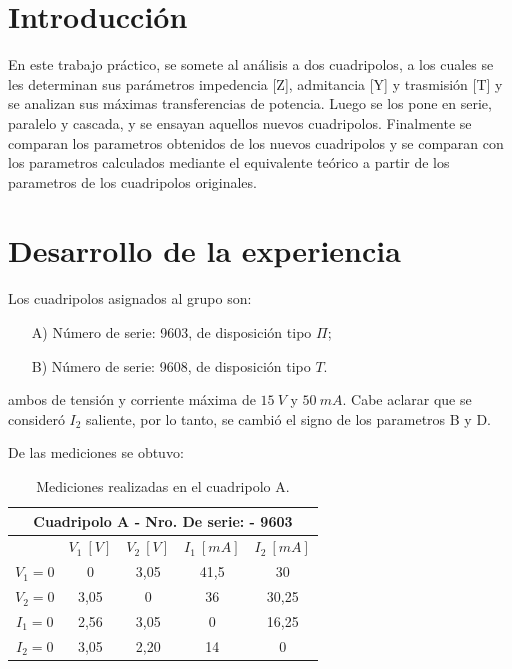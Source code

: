 \documentclass[a4paper]{article}
\begin{document}




\section*{Introducción}

En este trabajo práctico, se somete al análisis a dos cuadripolos, a los cuales se les determinan sus parámetros impedencia [Z], admitancia [Y] y trasmisión [T] y se analizan sus máximas transferencias de potencia. Luego se los pone en serie, paralelo y cascada, y se ensayan aquellos nuevos cuadripolos. Finalmente se comparan los parametros obtenidos de los nuevos cuadripolos y se comparan con los parametros calculados mediante el equivalente teórico a partir de los parametros de los cuadripolos originales.

\section*{Desarrollo de la experiencia}

Los cuadripolos asignados al grupo son:
\begin{enumerate}
	\item[A)] Número de serie: 9603, de disposición tipo $\Pi$;
	\item[B)] Número de serie: 9608, de disposición tipo $T$.
\end{enumerate}
ambos de tensión y corriente máxima de $15 \ V$ y $50 \ mA$. Cabe aclarar que se consideró $I_2$ saliente, por lo tanto, se cambió el signo de los parametros B y D.

De las mediciones se obtuvo:

\begin{table}[H]
\begin{center}
\begin{tabular}{|c|c|c|c|c|}
\hline
\multicolumn{5}{|c|}{Cuadripolo A - Nro. De serie: - 9603} \\ \hline
 & $V_1 \ [V]$ & $V_2 \ [V]$ & $I_1 \ [mA]$ & $I_2 \ [mA]$ \\ \hline
$V_1 = 0$ & 0 & 3,05 & 41,5 & 30 \\ \hline
$V_2 = 0$ & 3,05 & 0 & 36 & 30,25 \\ \hline
$I_1 = 0$ & 2,56 & 3,05 & 0 & 16,25 \\ \hline
$I_2 = 0$ & 3,05 & 2,20 & 14 & 0 \\ \hline
\end{tabular}
\caption{Mediciones realizadas en el cuadripolo A.}
\end{center}
\end{table}
\end{document}
